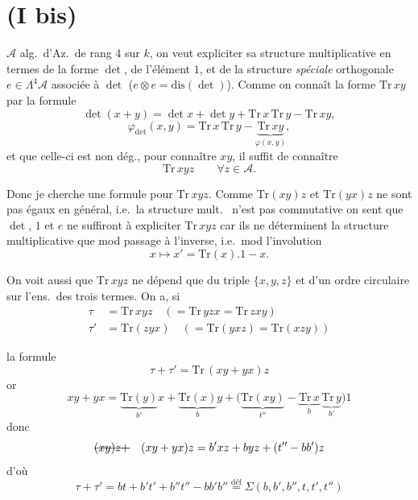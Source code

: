 \documentclass[11pt,a4paper]{article}
\begin{document}
\section{(I bis)}


$\mathcal{A}$ alg.\ d'Az.\ de rang 4 sur $k$, on veut expliciter sa structure
multiplicative en termes de la forme $\det$, de l'élément $1$, et de la
structure \emph{spéciale} orthogonale $e \in \Lambda^4 \mathcal{A}$
  associée à $\det$ ($e \otimes e = \mathrm{dis}(\det)$).
Comme on connaît  la forme $\mathrm{Tr}\, xy$ par la formule
\[
  \det(x+y) = \det x + \det y + \mathrm{Tr}\, x\, \mathrm{Tr}\, y - \mathrm{Tr}\, xy ,
\]
\[
  \varphi_{\det}(x,y) = \mathrm{Tr}\, x\, \mathrm{Tr}\, y - \underbrace{\mathrm{Tr}\, xy}_{\varphi(x,y)} ,
\]
 et que celle-ci est non dég., pour connaître $xy$, il suffit de connaître
\[
  \mathrm{Tr}\, xyz \qquad \forall z \in \mathcal{A} .
\]

Donc je cherche une formule pour $\mathrm{Tr}\, xyz$. Comme $\mathrm{Tr}(xy)z$ et
$\mathrm{Tr}(yx)z$ ne sont pas égaux en général, i.e.\ la structure mult.\
 n'est pas commutative  on sent que $\det$, $1$ et
$e$ ne suffiront à expliciter $\mathrm{Tr}\, xyz$ car ils ne déterminent la
structure multiplicative que mod passage à l'inverse, i.e.\ mod l'involution
\[
  x \longmapsto x' = \mathrm{Tr}(x).1 - x .
\]

On voit aussi que $\mathrm{Tr}\, xyz$ ne dépend que du triple $\{x,y,z\}$ et d'un
ordre circulaire sur l'ens.\ des trois termes. On a, \struck{pour} si
\[
  \begin{aligned}
    \tau &= \mathrm{Tr}\, xyz \quad (= \mathrm{Tr}\, yzx = \mathrm{Tr}\, zxy) \\
    \tau' &= \mathrm{Tr}(zyx) \quad (= \mathrm{Tr}(yxz) = \mathrm{Tr}(xzy))
  \end{aligned}
\]

la formule
\[
  \tau + \tau' = \mathrm{Tr}\,(xy+yx)z
\]
or
\[
  xy + yx = \underbrace{\mathrm{Tr}(y)}_{b'} x + \underbrace{\mathrm{Tr}(x)}_{b} y
  + \bigl(\underbrace{\mathrm{Tr}(xy)}_{t''} - \underbrace{\mathrm{Tr}\, x}_{b}\, \underbrace{\mathrm{Tr}\, y}_{b'}\bigr) 1
\]
donc
\[
  \text{\struck{$(xy)z+$}}\quad (xy+yx)z = b'xz + byz + (t''-bb')z
\]
d'où
\[
  \boxed{\tau + \tau' = bt + b't' + b''t'' - bb'b''}
  \overset{\text{déf}}{=} \Sigma(b,b',b'',t,t',t'')
\]
\end{document}
